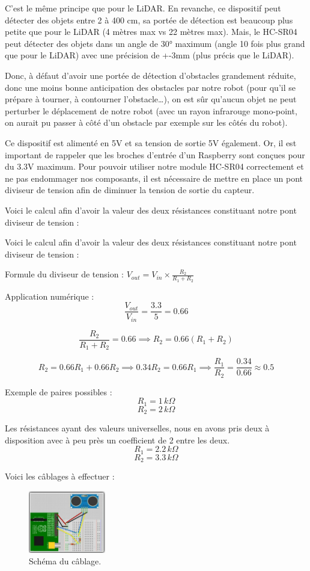 \documentclass[a4paper,12pt]{report}  %
\begin{document}
C’est le même principe que pour le LiDAR. 
En revanche, ce dispositif peut détecter des objets entre 2 à 400 cm, sa portée de détection est beaucoup plus petite que pour le LiDAR (4 mètres max vs 22 mètres max). Mais, le HC-SR04 peut détecter des objets dans un angle de 30° maximum (angle 10 fois plus grand que pour le LiDAR) avec une précision de +-3mm (plus précis que le LiDAR).

Donc, à défaut d’avoir une portée de détection d’obstacles grandement réduite, donc une moins bonne anticipation des obstacles par notre robot (pour qu’il se prépare à tourner, à contourner l’obstacle…), on est sûr qu’aucun objet ne peut perturber le déplacement de notre robot (avec un rayon infrarouge mono-point, on aurait pu passer à côté d’un obstacle par exemple sur les côtés du robot).

Ce dispositif est alimenté en 5V et sa tension de sortie 5V également. Or, il est important de rappeler que les broches d’entrée d’un Raspberry sont conçues pour du 3.3V maximum. Pour pouvoir utiliser notre module HC-SR04 correctement et ne pas endommager nos composants, il est nécessaire de mettre en place un pont diviseur de tension afin de diminuer la tension de sortie du capteur.


Voici le calcul afin d’avoir la valeur des deux résistances constituant notre pont diviseur de tension : 


Voici le calcul afin d’avoir la valeur des deux résistances constituant notre pont diviseur de tension : 

Formule du diviseur de tension : $V_{out} = V_{in} \times \frac{R_2}{R_1 + R_2}$

Application numérique : $$\frac{V_{out}}{V_{in}} = \frac{3.3}{5} = 0.66$$

$$\frac{R_2}{R_1 + R_2} = 0.66 \implies R_2 = 0.66 (R_1 + R_2)$$

$$R_2 = 0.66 R_1 + 0.66 R_2 \implies 0.34 R_2 = 0.66 R_1 \implies \frac{R_1}{R_2} = \frac{0.34}{0.66} \approx 0.5$$


Exemple de paires possibles : 
$$R_1 = 1 \, k\Omega$$
$$R_2 = 2 \, k\Omega$$

Les résistances ayant des valeurs universelles, 
nous en avons pris deux à disposition avec à peu près un coefficient de 2 entre les deux.
$$R_1 = 2.2 \, k\Omega$$
$$R_2 = 3.3 \, k\Omega$$

Voici les câblages à effectuer :

\begin{figure}[H]
	\centering
	\includegraphics[width=0.3\textwidth]{./attachments/capteur_ultrason_rpi.jpg}
	\caption{Schéma du câblage.}
	
\end{figure}
\end{document}
